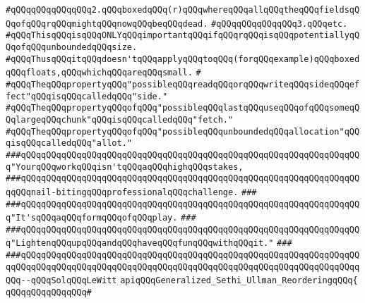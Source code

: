 \verb|#qQQqqQQqqQQqqQQq2.qQQqboxedqQQq(r)qQQqwhereqQQqallqQQqtheqQQqfieldsqQQqofqQQqrqQQqmightqQQqnowqQQqbeqQQqdead.|\newline
\verb|#qQQqqQQqqQQqqQQq3.qQQqetc.|\newline
\verb|#qQQqThisqQQqisqQQqONLYqQQqimportantqQQqifqQQqrqQQqisqQQqpotentiallyqQQqofqQQqunboundedqQQqsize.|\newline
\verb|#qQQqThusqQQqitqQQqdoesn'tqQQqapplyqQQqtoqQQq(forqQQqexample)qQQqboxedqQQqfloats,qQQqwhichqQQqareqQQqsmall.|\newline
\verb|#|\newline
\verb|#qQQqTheqQQqpropertyqQQq"possibleqQQqreadqQQqorqQQqwriteqQQqsideqQQqeffect"qQQqisqQQqcalledqQQq"side."|\newline
\verb|#qQQqTheqQQqpropertyqQQqofqQQq"possibleqQQqlastqQQquseqQQqofqQQqsomeqQQqlargeqQQqchunk"qQQqisqQQqcalledqQQq"fetch."|\newline
\verb|#qQQqTheqQQqpropertyqQQqofqQQq"possibleqQQqunboundedqQQqallocation"qQQqisqQQqcalledqQQq"allot."|\newline
\newline
\newline
\newline
\verb|###qQQqqQQqqQQqqQQqqQQqqQQqqQQqqQQqqQQqqQQqqQQqqQQqqQQqqQQqqQQqqQQqqQQq"YourqQQqworkqQQqisn'tqQQqaqQQqhighqQQqstakes,|\newline
\verb|###qQQqqQQqqQQqqQQqqQQqqQQqqQQqqQQqqQQqqQQqqQQqqQQqqQQqqQQqqQQqqQQqqQQqqQQqnail-bitingqQQqprofessionalqQQqchallenge.|\newline
\verb|###|\newline
\verb|###qQQqqQQqqQQqqQQqqQQqqQQqqQQqqQQqqQQqqQQqqQQqqQQqqQQqqQQqqQQqqQQqqQQq"It'sqQQqaqQQqformqQQqofqQQqplay.|\newline
\verb|###|\newline
\verb|###qQQqqQQqqQQqqQQqqQQqqQQqqQQqqQQqqQQqqQQqqQQqqQQqqQQqqQQqqQQqqQQqqQQq"LightenqQQqupqQQqandqQQqhaveqQQqfunqQQqwithqQQqit."|\newline
\verb|###|\newline
\verb|###qQQqqQQqqQQqqQQqqQQqqQQqqQQqqQQqqQQqqQQqqQQqqQQqqQQqqQQqqQQqqQQqqQQqqQQqqQQqqQQqqQQqqQQqqQQqqQQqqQQqqQQqqQQqqQQqqQQqqQQqqQQqqQQqqQQqqQQqqQQq--qQQqSolqQQqLeWitt|\newline
\newline
\newline
\verb|apiqQQqGeneralized_Sethi_Ullman_ReorderingqQQq{|\newline
\verb|qQQqqQQqqQQqqQQq#|\newline
